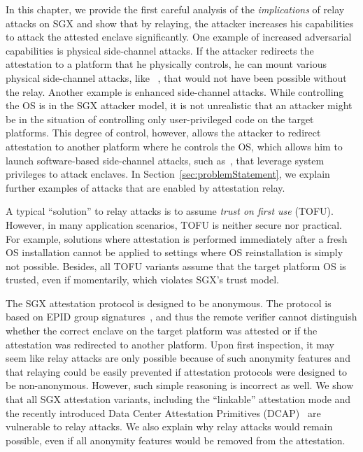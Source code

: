 In this chapter, we provide the first careful analysis of the \emph{implications} of relay attacks on SGX and show that by relaying, the attacker increases his capabilities to attack the attested enclave significantly. One example of increased adversarial capabilities is physical side-channel attacks. If the attacker redirects the attestation to a platform that he physically controls, he can mount various physical side-channel attacks, like ~\cite{genkin2016physical,wang2006covert,gandolfi2001electromagnetic, shamir2004acoustic}, that would not have been possible without the relay. Another example is enhanced side-channel attacks. While controlling the OS is in the SGX attacker model, it is not unrealistic that an attacker might be in the situation of controlling only user-privileged code on the target platforms. This degree of control, however, allows the attacker to redirect attestation to another platform where he controls the OS, which allows him to launch software-based side-channel attacks, such as~\cite{moghimi2017cachezoom, brasser2017software, gotzfried2017cache}, that leverage system privileges to attack enclaves. In Section~\ref{sec:problemStatement}, we explain further examples of attacks that are enabled by attestation relay.



A typical ``solution'' to relay attacks is to assume \emph{trust on first use} (TOFU). However, in many application scenarios, TOFU is neither secure nor practical. For example, solutions where attestation is performed immediately after a fresh OS installation cannot be applied to settings where OS reinstallation is simply not possible. Besides, all TOFU variants assume that the target platform OS is trusted, even if momentarily, which violates SGX's trust model. %



The SGX attestation protocol is designed to be anonymous. The protocol is based on EPID group signatures~\cite{epid_attestation}, and thus the remote verifier cannot distinguish whether the correct enclave on the target platform was attested or if the attestation was redirected to another platform. Upon first inspection, it may seem like relay attacks are only possible because of such anonymity features and that relaying could be easily prevented if attestation protocols were designed to be non-anonymous. However, such simple reasoning is incorrect as well. 
%
We show that all SGX attestation variants, including the ``linkable'' attestation mode and the recently introduced Data Center Attestation Primitives (DCAP)~\cite{DCAP} are vulnerable to relay attacks. We also explain why relay attacks would remain possible, even if all anonymity features would be removed from the attestation.


